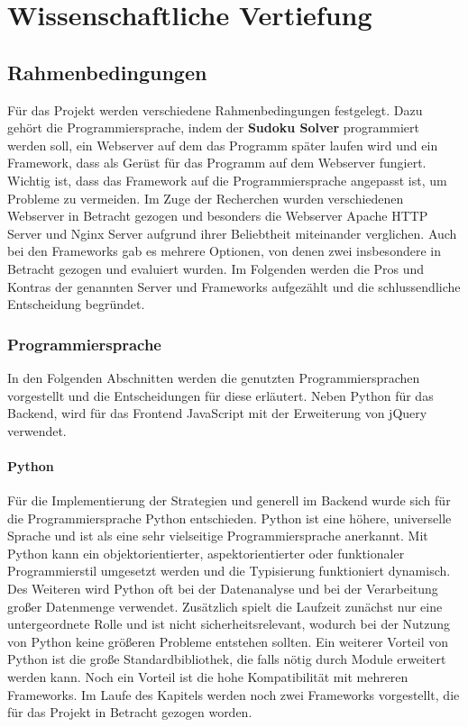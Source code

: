 
\part{Wissenschaftliche Vertiefung}

\chapter{Rahmenbedingungen}
Für das Projekt werden verschiedene Rahmenbedingungen festgelegt. Dazu gehört die Programmiersprache, indem der \textbf{Sudoku Solver} programmiert werden soll, ein Webserver auf dem das Programm später laufen wird und ein Framework, dass als Gerüst für das Programm auf dem Webserver fungiert. Wichtig ist, dass das Framework auf die Programmiersprache angepasst ist, um Probleme zu vermeiden. Im Zuge der Recherchen wurden verschiedenen Webserver in Betracht gezogen und besonders die Webserver Apache HTTP Server und Nginx Server aufgrund ihrer Beliebtheit miteinander verglichen. Auch bei den Frameworks gab es mehrere Optionen, von denen zwei insbesondere in Betracht gezogen und evaluiert wurden. Im Folgenden werden die Pros und Kontras  der genannten Server und Frameworks aufgezählt und die schlussendliche Entscheidung begründet.

\section{Programmiersprache}
In den Folgenden Abschnitten werden die genutzten Programmiersprachen vorgestellt und die Entscheidungen für diese erläutert. Neben Python für das Backend, wird für das Frontend JavaScript mit der Erweiterung von jQuery verwendet.

\subsection{Python}
Für die Implementierung der Strategien und generell im Backend wurde sich für die Programmiersprache Python entschieden. Python ist eine höhere, universelle Sprache und ist als eine sehr vielseitige Programmiersprache anerkannt. Mit Python kann ein objektorientierter, aspektorientierter oder funktionaler Programmierstil umgesetzt werden und die Typisierung funktioniert dynamisch. Des Weiteren wird Python oft bei der Datenanalyse und bei der Verarbeitung großer Datenmenge verwendet. Zusätzlich spielt die Laufzeit zunächst nur eine untergeordnete Rolle und ist nicht sicherheitsrelevant, wodurch bei der Nutzung von Python keine größeren Probleme entstehen sollten.
Ein weiterer Vorteil von Python ist die große Standardbibliothek, die falls nötig durch Module erweitert werden kann. Noch ein Vorteil ist die hohe Kompatibilität mit mehreren Frameworks. Im Laufe des Kapitels werden noch zwei Frameworks vorgestellt, die für das Projekt in Betracht gezogen worden.

